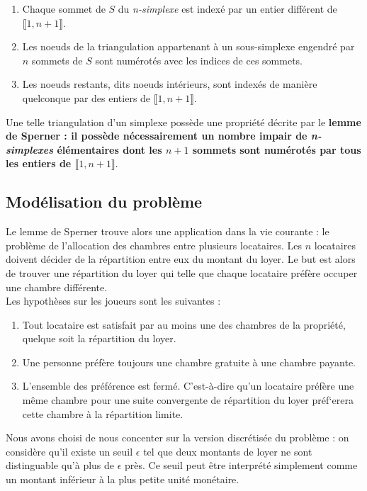 \documentclass[12pt,twoside,a4paper]{article}
\begin{document}
\begin{enumerate}
\item Chaque sommet de $S$ du \textit{n-simplexe} est index\'e par un entier diff\'erent de $\llbracket1,n+1 \rrbracket$.
\item Les noeuds de la triangulation appartenant \`a un sous-simplexe engendr\'e par $n$ sommets de $S$ sont num\'erot\'es avec les indices de ces sommets.
\item Les noeuds restants, dits noeuds int\'erieurs, sont index\'es de mani\`ere quelconque par des entiers de $\llbracket 1,n+1 \rrbracket$.
\end{enumerate}


Une telle triangulation d'un simplexe poss\`ede une propriété d\'ecrite par le \textbf{lemme de Sperner : il possède n\'ecessairement un nombre impair de \textit{n-simplexes} élémentaires dont les $n+1$ sommets sont num\'erot\'es par tous les entiers de $\llbracket 1,n+1 \rrbracket$}.

\subsection{Mod\'elisation du probl\`eme}

Le lemme de Sperner trouve alors une application dans la vie courante : le probl\`eme de l'allocation des chambres entre plusieurs locataires. Les $n$ locataires doivent d\'ecider de la r\'epartition entre eux du montant du loyer. Le but est alors de trouver une r\'epartition du loyer qui telle que chaque locataire pr\'ef\`ere occuper une chambre diff\'erente.\\

\noindent Les hypothèses sur les joueurs sont les suivantes :
\begin{enumerate}
	\item Tout locataire est satisfait par au moins une des chambres de la propri\'et\'e, quelque soit la r\'epartition du loyer.
	\item Une personne pr\'ef\`ere toujours une chambre gratuite \`a une chambre payante.
	\item L'ensemble des pr\'ef\'erence est ferm\'e. C'est-\`a-dire qu'un locataire pr\'ef\`ere une m\^eme chambre pour une suite convergente de r\'epartition du loyer pr\'ef`erera cette chambre \`a la r\'epartition limite.
\end{enumerate}

\bigskip

Nous avons choisi de nous concenter sur la version discr\'etis\'ee du probl\`eme : on consid\`ere qu'il existe un seuil $\epsilon$ tel que deux montants de loyer ne sont distinguable qu'\`a  plus de $\epsilon$ pr\`es. Ce seuil peut \^etre interpr\'et\'e simplement comme un montant inf\'erieur \`a la plus petite unit\'e mon\'etaire.\\
\end{document}

